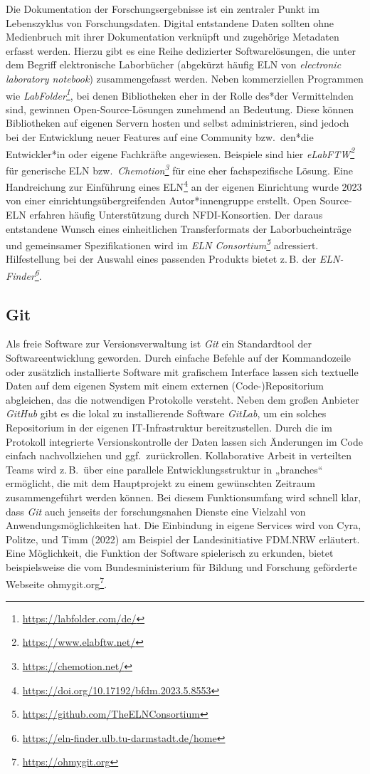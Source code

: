 \documentclass[
  11pt,
  letterpaper,
  DIV=11,
  twoside]{scrreprt}
\DeclareRobustCommand{\href}[2]{#2\footnote{\url{#1}}}
\begin{document}
Die Dokumentation der Forschungsergebnisse ist ein zentraler Punkt im
Lebenszyklus von Forschungsdaten. Digital entstandene Daten sollten ohne
Medienbruch mit ihrer Dokumentation verknüpft und zugehörige Metadaten
erfasst werden. Hierzu gibt es eine Reihe dedizierter Softwarelösungen,
die unter dem Begriff elektronische Laborbücher (abgekürzt häufig {ELN}
von \emph{electronic laboratory notebook}) zusammengefasst werden. Neben
kommerziellen Programmen wie
\emph{\href{https://labfolder.com/de/}{LabFolder}}, bei denen
Bibliotheken eher in der Rolle des*der Vermittelnden sind, gewinnen
Open-Source-Lösungen zunehmend an Bedeutung. Diese können Bibliotheken
auf eigenen Servern hosten und selbst administrieren, sind jedoch bei
der Entwicklung neuer Features auf eine Community bzw.~den*die
Entwickler*in oder eigene Fachkräfte angewiesen. Beispiele sind hier
\emph{\href{https://www.elabftw.net/}{eLabFTW}} für generische {ELN}
bzw.~\emph{\href{https://chemotion.net/}{Chemotion}} für eine eher
fachspezifische Lösung. Eine
\href{https://doi.org/10.17192/bfdm.2023.5.8553}{Handreichung zur
Einführung eines {ELN}} an der eigenen Einrichtung wurde 2023 von einer
einrichtungsübergreifenden Autor*innengruppe erstellt. Open Source-{ELN}
erfahren häufig Unterstützung durch {NFDI}-Konsortien. Der daraus
entstandene Wunsch eines einheitlichen Transferformats der
Laborbucheinträge und gemeinsamer Spezifikationen wird im
\emph{\href{https://github.com/TheELNConsortium}{ELN Consortium}}
adressiert. Hilfestellung bei der Auswahl eines passenden Produkts
bietet z.\,B. der
\emph{\href{https://eln-finder.ulb.tu-darmstadt.de/home}{ELN-Finder}}.

\subsection{Git}\label{git}

Als freie Software zur Versionsverwaltung ist \emph{Git} ein
Standardtool der Softwareentwicklung geworden. Durch einfache Befehle
auf der Kommandozeile oder zusätzlich installierte Software mit
grafischem Interface lassen sich textuelle Daten auf dem eigenen System
mit einem externen (Code-)Repositorium abgleichen, das die notwendigen
Protokolle versteht. Neben dem großen Anbieter \emph{GitHub} gibt es die
lokal zu installierende Software \emph{GitLab}, um ein solches
Repositorium in der eigenen IT-Infrastruktur bereitzustellen. Durch die
im Protokoll integrierte Versionskontrolle der Daten lassen sich
Änderungen im Code einfach nachvollziehen und ggf.~zurückrollen.
Kollaborative Arbeit in verteilten Teams wird z.\,B.~über eine parallele
Entwicklungsstruktur in „branches`` ermöglicht, die mit dem Hauptprojekt
zu einem gewünschten Zeitraum zusammengeführt werden können. Bei diesem
Funktionsumfang wird schnell klar, dass \emph{Git} auch jenseits der
forschungsnahen Dienste eine Vielzahl von Anwendungsmöglichkeiten hat.
Die Einbindung in eigene Services wird von Cyra, Politze, und Timm
(2022) am Beispiel der Landesinitiative FDM.NRW erläutert. Eine
Möglichkeit, die Funktion der Software spielerisch zu erkunden, bietet
beispielsweise die vom Bundesministerium für Bildung und Forschung
geförderte Webseite \href{https://ohmygit.org}{ohmygit.org}.
\end{document}
